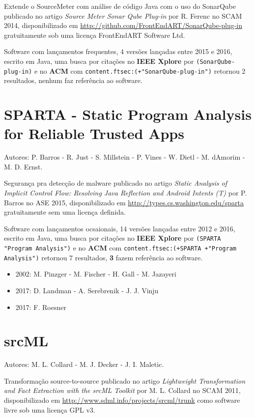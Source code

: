 Extende o SourceMeter com análise de código Java com o uso do SonarQube
publicado no artigo {\it Source Meter Sonar Qube Plug-in}
por R. Ferenc
no SCAM 2014,
disponibilizado em \url{http://github.com/FrontEndART/SonarQube-plug-in}
gratuitamente
sob uma licença FrontEndART Software Ltd.

Software com lançamentos frequentes,
4 versões lançadas
entre 2015 e 2016,
escrito em Java,
uma busca por citações no {\bf IEEE Xplore} por
\texttt{(SonarQube-plug-in)}
e no {\bf ACM} com
\texttt{content.ftsec:(+"SonarQube-plug-in")}
retornou
2 resultados,
nenhum faz referência ao software.


\section{SPARTA - Static Program Analysis for Reliable Trusted Apps}

Autores:
P. Barros - R. Just - S. Millstein - P. Vines - W. Dietl - M. dAmorim - M. D. Ernst.

Segurança pra detecção de malware
publicado no artigo {\it Static Analysis of Implicit Control Flow: Resolving Java Reflection and Android Intents (T)}
por P. Barros
no ASE 2015,
disponibilizado em \url{http://types.cs.washington.edu/sparta}
gratuitamente
sem uma licença definida.

Software com lançamentos ocsaionais,
14 versões lançadas
entre 2012 e 2016,
escrito em Java,
uma busca por citações no {\bf IEEE Xplore} por
\texttt{(SPARTA "Program Analysis")}
e no {\bf ACM} com
\texttt{content.ftsec:(+SPARTA +"Program Analysis")}
retornou
7 resultados,
{\bf 3} fazem referência ao software.

\begin{itemize}
\item 2002: M. Pinzger - M. Fischer - H. Gall - M. Jazayeri
\item 2017: D. Landman - A. Serebrenik - J. J. Vinju
\item 2017: F. Roesner
\end{itemize}

\section{srcML}

Autores:
M. L. Collard - M. J. Decker - J. I. Maletic.

Transformação source-to-source
publicado no artigo {\it Lightweight Transformation and Fact Extraction with the srcML Toolkit}
por M. L. Collard
no SCAM 2011,
disponibilizado em \url{http://www.sdml.info/projects/srcml/trunk}
como software livre
sob uma licença GPL v3.

